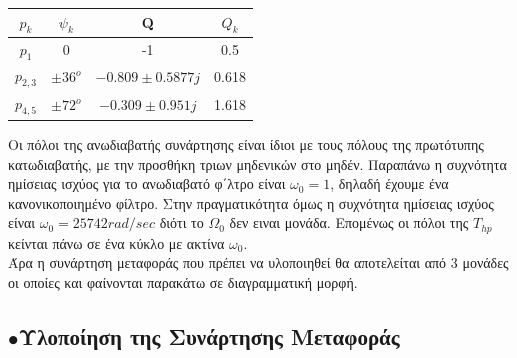 \documentclass{article}
\begin{document}
{{\begin{center}

 \begin{tabular}{|c|c|c|c|}
        \hline
       \qquad $p_k$ \qquad \qquad & \qquad $ψ_k$ \qquad \qquad &\qquad \qquad Q \qquad \qquad \qquad & \qquad \qquad $Q_k$ \qquad \qquad \qquad \\
        \hline
        $p_1$ & $0$ & -1 & 0.5\\
        \hline
        $p_{2,3}$ & $\pm36^o$ & $ -0.809 \pm 0.5877j$&0.618\\
        \hline
        $p_{4,5}$ & $\pm72^o$ & $-0.309 \pm 0.951j$&1.618\\
        \hline
        \end{tabular}
\end{center}
Οι πόλοι της ανωδιαβατής συνάρτησης είναι ίδιοι με τους πόλους της πρωτότυπης κατωδιαβατής, με την προσθήκη τριων μηδενικών στο μηδέν. Παραπάνω η συχνότητα ημίσειας ισχύος για το ανωδιαβατό φ΄λτρο είναι $ω_0=1$, δηλαδή έχουμε ένα κανονικοποιημένο φίλτρο. Στην πραγματικότητα όμως η συχνότητα ημίσειας ισχύος είναι $ω_0 = 25742 rad/sec$ διότι το $Ω_0$ δεν ειναι μονάδα. Επομένως οι πόλοι της $T_{hp}$ κείνται πάνω σε ένα κύκλο με ακτίνα $ω_0$.\\
Άρα η συνάρτηση μεταφοράς που πρέπει να υλοποιηθεί θα αποτελείται από 3 μονάδες οι οποίες και φαίνονται παρακάτω σε διαγραμματική μορφή. \\
\begin{center}
\raisebox{-6ex}{$\to$}%
%
\raisebox{-6ex}{$\to$}%
%
\raisebox{-6ex}{$\to$}%
%
\raisebox{-6ex}{$\to$}%
\end{center} 
\newpage 
\subsection*{$\bullet$Υλοποίηση της Συνάρτησης Μεταφοράς} 

}}
\end{document}
